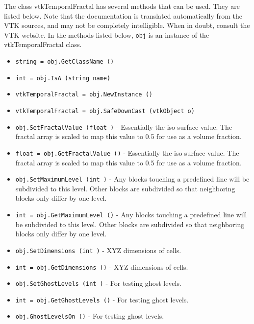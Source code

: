 The class vtkTemporalFractal has several methods that can be used.
  They are listed below.
Note that the documentation is translated automatically from the VTK sources,
and may not be completely intelligible.  When in doubt, consult the VTK website.
In the methods listed below, \verb|obj| is an instance of the vtkTemporalFractal class.
\begin{itemize}
\item  \verb|string = obj.GetClassName ()|

\item  \verb|int = obj.IsA (string name)|

\item  \verb|vtkTemporalFractal = obj.NewInstance ()|

\item  \verb|vtkTemporalFractal = obj.SafeDownCast (vtkObject o)|

\item  \verb|obj.SetFractalValue (float )| -  Essentially the iso surface value.
 The fractal array is scaled to map this value to 0.5 for use as a volume
 fraction.

\item  \verb|float = obj.GetFractalValue ()| -  Essentially the iso surface value.
 The fractal array is scaled to map this value to 0.5 for use as a volume
 fraction.

\item  \verb|obj.SetMaximumLevel (int )| -  Any blocks touching a predefined line will be subdivided to this level.
 Other blocks are subdivided so that neighboring blocks only differ
 by one level.

\item  \verb|int = obj.GetMaximumLevel ()| -  Any blocks touching a predefined line will be subdivided to this level.
 Other blocks are subdivided so that neighboring blocks only differ
 by one level.

\item  \verb|obj.SetDimensions (int )| -  XYZ dimensions of cells.

\item  \verb|int = obj.GetDimensions ()| -  XYZ dimensions of cells.

\item  \verb|obj.SetGhostLevels (int )| -  For testing ghost levels.

\item  \verb|int = obj.GetGhostLevels ()| -  For testing ghost levels.

\item  \verb|obj.GhostLevelsOn ()| -  For testing ghost levels.


\end{itemize}
